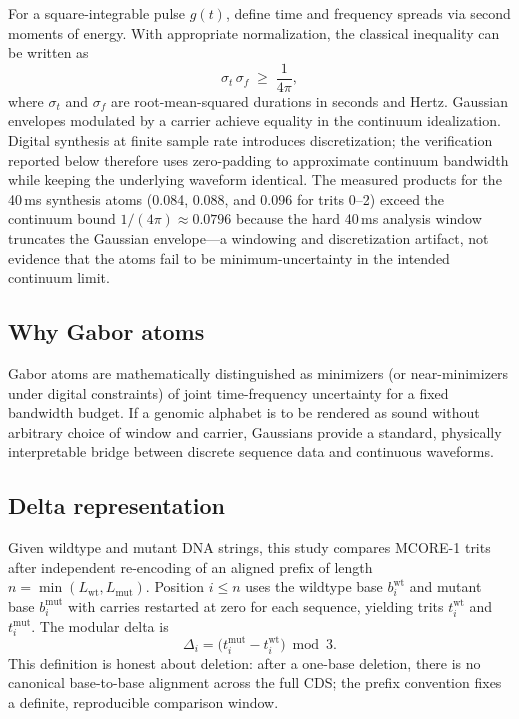 \documentclass[preprint,12pt]{elsarticle}
\begin{document}
For a square-integrable pulse $g(t)$, define time and frequency spreads via second moments of energy. With appropriate normalization, the classical inequality can be written as
\begin{equation}
  \sigma_t \,\sigma_f \;\ge\; \frac{1}{4\pi},
\end{equation}
where $\sigma_t$ and $\sigma_f$ are root-mean-squared durations in seconds and Hertz. Gaussian envelopes modulated by a carrier achieve equality in the continuum idealization. Digital synthesis at finite sample rate introduces discretization; the verification reported below therefore uses zero-padding to approximate continuum bandwidth while keeping the underlying waveform identical. The measured products for the 40\,ms synthesis atoms (0.084, 0.088, and 0.096 for trits 0--2) exceed the continuum bound $1/(4\pi)\approx 0.0796$ because the hard 40\,ms analysis window truncates the Gaussian envelope---a windowing and discretization artifact, not evidence that the atoms fail to be minimum-uncertainty in the intended continuum limit.

\subsection{Why Gabor atoms}

Gabor atoms are mathematically distinguished as minimizers (or near-minimizers under digital constraints) of joint time-frequency uncertainty for a fixed bandwidth budget. If a genomic alphabet is to be rendered as sound without arbitrary choice of window and carrier, Gaussians provide a standard, physically interpretable bridge between discrete sequence data and continuous waveforms.

\subsection{Delta representation}

Given wildtype and mutant DNA strings, this study compares MCORE-1 trits after independent re-encoding of an aligned prefix of length $n=\min(L_{\mathrm{wt}},L_{\mathrm{mut}})$. Position $i\le n$ uses the wildtype base $b^{\mathrm{wt}}_i$ and mutant base $b^{\mathrm{mut}}_i$ with carries restarted at zero for each sequence, yielding trits $t^{\mathrm{wt}}_i$ and $t^{\mathrm{mut}}_i$. The modular delta is
\begin{equation}
  \Delta_i = \bigl(t^{\mathrm{mut}}_i - t^{\mathrm{wt}}_i\bigr) \bmod 3 .
\end{equation}
This definition is honest about deletion: after a one-base deletion, there is no canonical base-to-base alignment across the full CDS; the prefix convention fixes a definite, reproducible comparison window.
\end{document}
